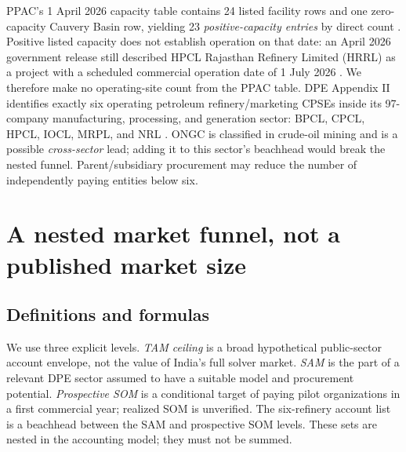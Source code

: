 \documentclass[11pt,a4paper]{article}
\begin{document}
PPAC's 1 April 2026 capacity table contains 24 listed facility rows and one zero-capacity Cauvery Basin row, yielding 23 \emph{positive-capacity entries} by direct count \cite{ppac2026}. Positive listed capacity does not establish operation on that date: an April 2026 government release still described HPCL Rajasthan Refinery Limited (HRRL) as a project with a scheduled commercial operation date of 1 July 2026 \cite{hrrl2026}. We therefore make no operating-site count from the PPAC table. DPE Appendix II identifies exactly six operating petroleum refinery/marketing CPSEs inside its 97-company manufacturing, processing, and generation sector: BPCL, CPCL, HPCL, IOCL, MRPL, and NRL \cite{dpeappendix}. ONGC is classified in crude-oil mining and is a possible \emph{cross-sector} lead; adding it to this sector's beachhead would break the nested funnel. Parent/subsidiary procurement may reduce the number of independently paying entities below six.

\section{A nested market funnel, not a published market size}

\subsection{Definitions and formulas}

We use three explicit levels. \emph{TAM ceiling} is a broad hypothetical public-sector account envelope, not the value of India's full solver market. \emph{SAM} is the part of a relevant DPE sector assumed to have a suitable model and procurement potential. \emph{Prospective SOM} is a conditional target of paying pilot organizations in a first commercial year; realized SOM is unverified. The six-refinery account list is a beachhead between the SAM and prospective SOM levels. These sets are nested in the accounting model; they must not be summed.
\end{document}

